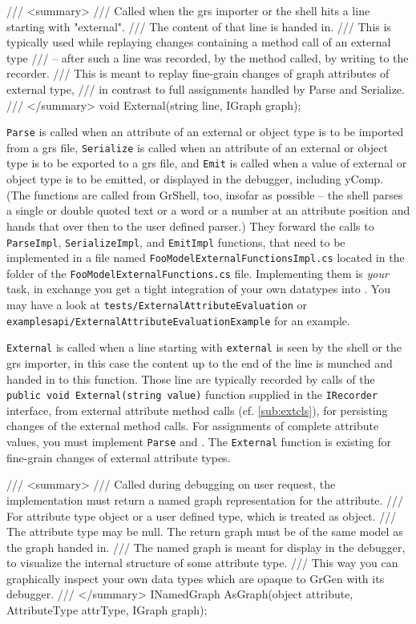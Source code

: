 \pagebreak

\begin{csharplet}
/// <summary>
/// Called when the grs importer or the shell hits a line starting with "external".
/// The content of that line is handed in.
/// This is typically used while replaying changes containing a method call of an external type
/// -- after such a line was recorded, by the method called, by writing to the recorder.
/// This is meant to replay fine-grain changes of graph attributes of external type,
/// in contrast to full assignments handled by Parse and Serialize.
/// </summary>
void External(string line, IGraph graph);
\end{csharplet}

\texttt{Parse} is called when an attribute of an external or object type is to be imported from a grs file, \texttt{Serialize} is called when an attribute of an external or object type is to be exported to a grs file, and \texttt{Emit} is called when a value of external or object type is to be emitted, or displayed in the debugger, including yComp.
(The functions are called from GrShell, too, insofar as possible -- the shell parses a single or double quoted text or a word or a number at an attribute position and hands that over then to the user defined parser.)
They forward the calls to \texttt{ParseImpl}, \texttt{SerializeImpl}, and \texttt{EmitImpl} functions, that need to be implemented in a file named \texttt{FooModelExternal\-FunctionsImpl.cs} located in the folder of the \texttt{FooModelExternalFunctions.cs} file.
Implementing them is \emph{your} task, in exchange you get a tight integration of your own datatypes into \GrG.
You may have a look at \texttt{tests/ExternalAttributeEvaluation} or \texttt{examples\-api/ExternalAttributeEvaluationExample} for an example.

\texttt{External} is called when a line starting with \texttt{external} is seen by the shell or the grs importer, in this case the content up to the end of the line is munched and handed in to this function.
Those line are typically recorded by calls of the \verb#public void External(string value)# function supplied in the \texttt{IRecorder} interface, from external attribute method calls (cf. \ref{sub:extcls}), for persisting changes of the external method calls.
For assignments of complete attribute values, you must implement \texttt{Parse} and . 
The \texttt{External} function is existing for fine-grain changes of external attribute types.

\begin{csharplet}
/// <summary>
/// Called during debugging on user request, the implementation must return a named graph representation for the attribute.
/// For attribute type object or a user defined type, which is treated as object.
/// The attribute type may be null. The return graph must be of the same model as the graph handed in.
/// The named graph is meant for display in the debugger, to visualize the internal structure of some attribute type.
/// This way you can graphically inspect your own data types which are opaque to GrGen with its debugger.
/// </summary>
INamedGraph AsGraph(object attribute, AttributeType attrType, IGraph graph);
\end{csharplet}

